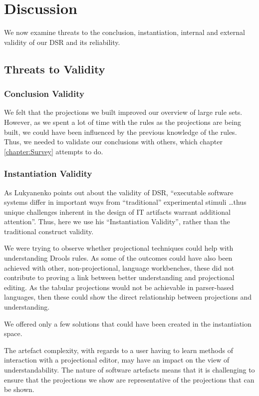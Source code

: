 \section{Discussion}
\label{section:dsr_discussion}

We now examine threats to the conclusion, instantiation, internal and external validity of our DSR and its reliability.

\subsection{Threats to Validity} 

\subsubsection{Conclusion Validity}
We felt that the projections we built improved our overview of large rule sets.
However, as we spent a lot of time with the rules as the projections are being built, we could have been influenced by the previous knowledge of the rules.
Thus, we needed to validate our conclusions with others, which chapter \ref{chapter:Survey} attempts to do.

\subsubsection{Instantiation Validity}
As Lukyanenko\cite{Lukyanenko_2014} points out about the validity of DSR, ``executable software systems differ in important ways from ``traditional'' experimental stimuli \dots thus unique challenges inherent in the design of IT artifacts warrant additional attention''.
Thus, here we use his ``Instantiation Validity'', rather than the traditional construct validity.

We were trying to observe whether projectional techniques could help with understanding Drools rules. 
As some of the outcomes could have also been achieved with other, non-projectional, language workbenches, these did not contribute to proving a link between better understanding and projectional editing.
As the tabular projections would not be achievable in parser-based languages, then these could show the direct relationship between projections and understanding.

We offered only a few solutions that could have been created in the instantiation space.

The artefact complexity, with regards to a user having to learn methods of interaction with a projectional editor, may have an impact on the view of understandability.
The nature of software artefacts means that it is challenging to ensure that the projections we show are representative of the projections that can be shown.

